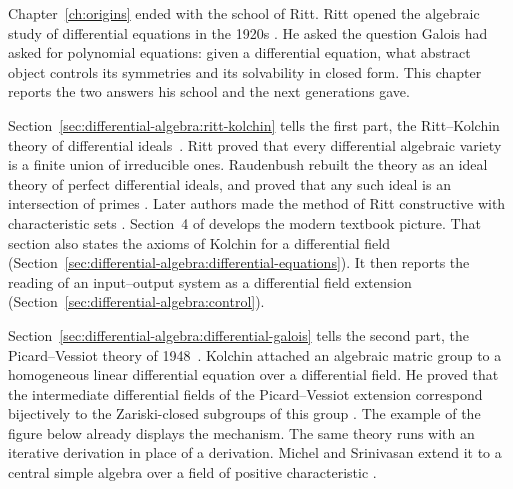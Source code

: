 
Chapter~\ref{ch:origins} ended with the school of Ritt. Ritt opened the
algebraic study of differential equations in the 1920s \cite[p.~1]{Ritt1950}. He asked the
question Galois had asked for polynomial equations: given a differential
equation, what abstract object controls its symmetries and its solvability
in closed form. This chapter reports the two answers his school and the
next generations gave.

Section~\ref{sec:differential-algebra:ritt-kolchin} tells the first part,
the Ritt--Kolchin theory of differential ideals~\cite{HubbardLundell2011}. Ritt proved that every
differential algebraic variety is a finite union of irreducible ones.
Raudenbush rebuilt the theory as an ideal theory of perfect differential
ideals, and proved that any such ideal is an intersection of primes
\cite[p.~365]{Raudenbush1934}. Later authors made the method of Ritt
constructive with characteristic sets \cite[p.~1]{HubbardLundell2011}. Section~4 of
\cite{HubbardLundell2011} develops the modern textbook picture.
That section also states the axioms of Kolchin for a differential field
(Section~\ref{sec:differential-algebra:differential-equations}). It then
reports the reading of an input--output system as a differential field
extension (Section~\ref{sec:differential-algebra:control}).

Section~\ref{sec:differential-algebra:differential-galois} tells the second
part, the Picard--Vessiot theory of 1948~\cite[Theorem~2.2, p.~3]{MichelSrinivasan2026}. Kolchin attached an algebraic
matric group to a homogeneous linear differential equation over a
differential field. He proved that the intermediate differential fields of
the Picard--Vessiot extension correspond bijectively to the Zariski-closed
subgroups of this group \cite[p.~32]{Kolchin1948PicardVessiot}. The
example of the figure below already displays the mechanism. The same theory
runs with an iterative derivation in place of a derivation. Michel and
Srinivasan extend it to a central simple algebra over a field of positive
characteristic \cite[Theorem~2.2, p.~3]{MichelSrinivasan2026}.

